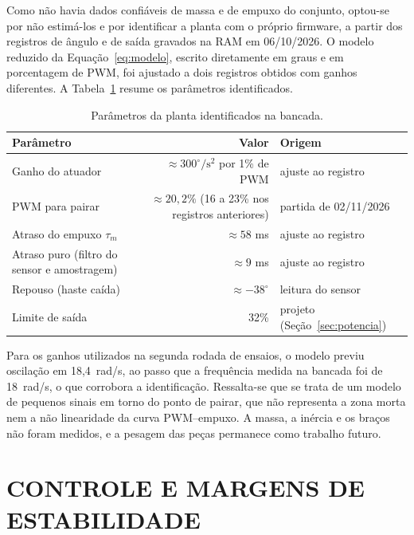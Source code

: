 Como não havia dados confiáveis de massa e de empuxo do conjunto, optou-se por não estimá-los e por identificar a planta com o próprio firmware, a partir dos registros de ângulo e de saída gravados na RAM em 06/10/2026. O modelo reduzido da Equação~\ref{eq:modelo}, escrito diretamente em graus e em porcentagem de PWM, foi ajustado a dois registros obtidos com ganhos diferentes. A Tabela~\ref{tab:parametros} resume os parâmetros identificados.
\begin{table}[H]
\centering\caption{Parâmetros da planta identificados na bancada.}\label{tab:parametros}
\begin{tabularx}{\textwidth}{Xrl}
\hline\textbf{Parâmetro} & \textbf{Valor} & \textbf{Origem}\\\hline
Ganho do atuador & $\approx 300^\circ/\mathrm{s}^2$ por 1\% de PWM & ajuste ao registro\\
PWM para pairar & $\approx 20{,}2\%$ (16 a 23\% nos registros anteriores) & partida de 02/11/2026\\
Atraso do empuxo $\tau_m$ & $\approx 58$ ms & ajuste ao registro\\
Atraso puro (filtro do sensor e amostragem) & $\approx 9$ ms & ajuste ao registro\\
Repouso (haste caída) & $\approx -38^\circ$ & leitura do sensor\\
Limite de saída & 32\% & projeto (Seção~\ref{sec:potencia})\\\hline
\end{tabularx}
\end{table}
Para os ganhos utilizados na segunda rodada de ensaios, o modelo previu oscilação em 18,4~rad/s, ao passo que a frequência medida na bancada foi de 18~rad/s, o que corrobora a identificação. Ressalta-se que se trata de um modelo de pequenos sinais em torno do ponto de pairar, que não representa a zona morta nem a não linearidade da curva PWM--empuxo. A massa, a inércia e os braços não foram medidos, e a pesagem das peças permanece como trabalho futuro.

\section{CONTROLE E MARGENS DE ESTABILIDADE}\label{sec:margens}

